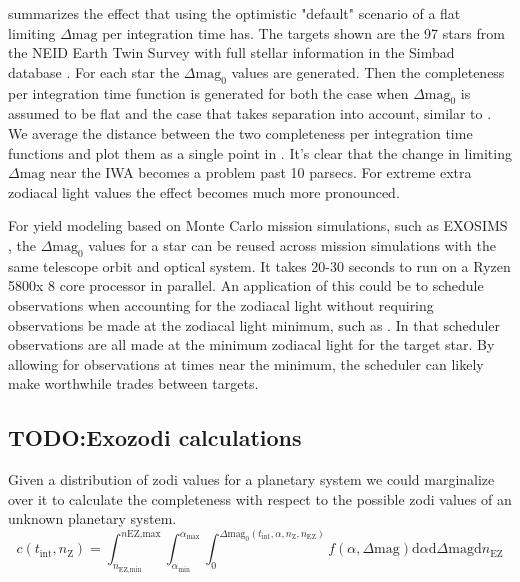  summarizes the effect that using the optimistic
"default" scenario of a flat limiting $\Delta\textrm{mag}$ per integration time
has. The targets shown are the 97 stars from the NEID Earth Twin Survey with
full stellar information in the Simbad database
\citep{guptaTargetPrioritization2021}. For each star the $\Delta\textrm{mag}_0$
values are generated. Then the completeness per integration time function is
generated for both the case when $\Delta\textrm{mag}_0$ is assumed to be flat
and the case that takes separation into account, similar to
. We average the distance between the two completeness
per integration time functions and plot them as a single point in
. It's clear that the change in limiting
$\Delta\textrm{mag}$ near the IWA becomes a problem past 10 parsecs. For
extreme extra zodiacal light values the effect becomes much more pronounced.

For yield modeling based on Monte Carlo mission simulations, such as EXOSIMS
\citep{savranskyWFIRSTAFTACoronagraphScience2015, delacroixScienceYield2016,
savranskyEXOSIMSExoplanetOpenSource2017}, the $\Delta\textrm{mag}_0$ values for
a star can be reused across mission simulations with the same telescope orbit
and optical system. It takes 20-30 seconds to run on a Ryzen 5800x 8 core
processor in parallel. An application of this could be to schedule observations
when accounting for the zodiacal light without requiring observations be made
at the zodiacal light minimum, such as \citet{keithlyOptimalScheduling2020}. In
that scheduler observations are all made at the minimum zodiacal light for the
target star. By allowing for observations at times near the minimum, the
scheduler can likely make worthwhile trades between targets.

\subsection{TODO:Exozodi calculations}
Given a distribution of zodi values for a planetary system we could marginalize
over it to calculate the completeness with respect to the possible zodi values
of an unknown planetary system.
\begin{equation}
  c(t_\textrm{int}, n_\textrm{Z}) = 
  \int_{n_\textrm{EZ,min}}^{n\textrm{EZ,max}} 
  \int_{\alpha_\textrm{min}}^{\alpha_\textrm{max}} 
  \int_{0}^{\Delta\textrm{mag}_0(t_\textrm{int}, \alpha, n_\textrm{Z}, n_\textrm{EZ})}
  f(\alpha, \Delta\textrm{mag}) \textrm{d}\alpha \textrm{d}\Delta\textrm{mag} \textrm{d}n_\textrm{EZ}
  \label{eq:comp_integral}
\end{equation}

